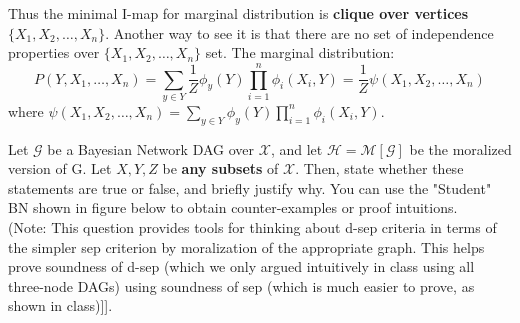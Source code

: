 \documentclass[addpoints,11pt,a4paper]{exam}
\newcommand{\G}{\mathcal{G}}
\newcommand{\fH}{\mathcal{H}}
\newcommand{\M}{\mathcal{M}}
\begin{document}
\begin{questions}
\begin{parts}
\begin{solution}
Thus the minimal I-map for marginal distribution is \textbf{clique over vertices $\{X_1,X_2,\dots,X_n\}$}. Another way to see it is that there are no set of independence properties over $\{X_1,X_2,\dots,X_n\}$ set.
The marginal distribution:
\begin{equation}
    P(Y,X_1,\dots, X_n) = \sum_{y\in Y}\frac{1}{Z}\phi_y(Y)\prod_{i=1}^n \phi_i(X_i,Y)=\frac{1}{Z}\psi(X_1,X_2,\dots,X_n)
\end{equation}
where $\psi(X_1,X_2,\dots,X_n)=\sum_{y\in Y}\phi_y(Y)\prod_{i=1}^n \phi_i(X_i,Y)$.
\end{solution}
\end{parts}

Let $\G$ be a Bayesian Network DAG over $\mathcal{X}$, and let $\fH=\M[\G]$ be the moralized version of G. Let $X,Y,Z$ be {\bf any subsets} of $\mathcal{X}$. Then, state whether these statements are true or false, and briefly justify why. You can use the "Student" BN shown in figure below to obtain counter-examples or proof intuitions. 
\\(Note: This question provides tools for thinking about d-sep criteria in terms of the simpler sep criterion by moralization of the appropriate graph. This helps prove soundness of d-sep (which we only argued intuitively in class using all three-node DAGs) using soundness of sep (which is much easier to prove, as shown in class)]].
\end{questions}
\end{document}
